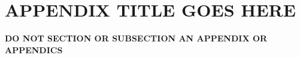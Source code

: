 \chapter{APPENDIX TITLE GOES HERE} \label{ap:a}


{\bf DO NOT SECTION OR SUBSECTION AN APPENDIX OR APPENDICS}



